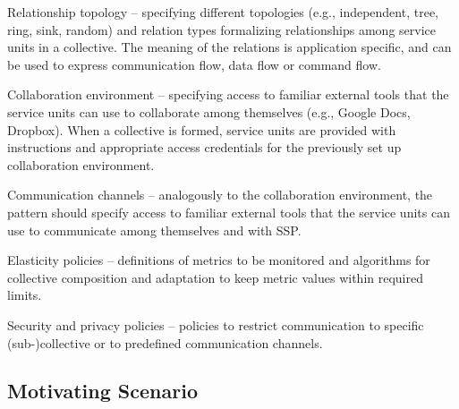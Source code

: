           \begin{LaTeXdescription}
            \item Relationship topology -- specifying different topologies (e.g., independent, tree, ring, sink, random) and relation types formalizing relationships among service units in a collective. The meaning of the relations is application specific, and can be used to express communication flow, data flow or command flow. 
            
            \item Collaboration environment -- specifying access to familiar external tools that the service units can use to collaborate among themselves (e.g., Google Docs, Dropbox). When a collective is formed, service units are provided with instructions and appropriate access credentials for the previously set up collaboration environment. 
            
            \item Communication channels -- analogously to the collaboration environment, the pattern should specify access to familiar external tools that the service units can use to communicate among themselves and with SSP. 
            
            \item Elasticity policies -- definitions of metrics to be monitored and algorithms for collective composition and adaptation to keep metric values within required limits.

            \item Security and privacy policies -- policies to restrict communication to specific (sub-)collective or to predefined communication channels.
            
          \end{LaTeXdescription}


    \subsection{Motivating Scenario}
    \label{sec:intro:scenario}

